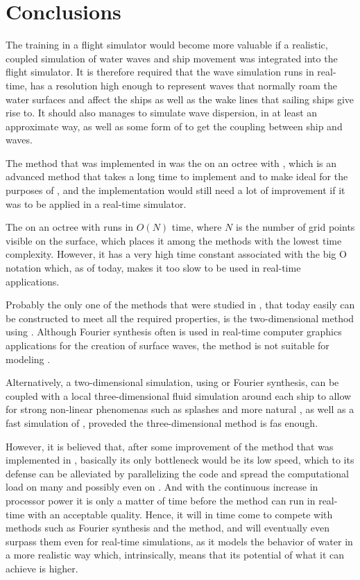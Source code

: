 \chapter{Conclusions}
\label{chap:conclusions}

The training in a flight simulator would become more valuable if a realistic, coupled simulation of water waves and ship movement was integrated into the flight simulator. It is therefore required that the wave simulation runs in real-time, has a resolution high enough to represent waves that normally roam the water surfaces and affect the ships as well as the wake lines that sailing ships give rise to. It should also manages to simulate wave dispersion, in at least an approximate way, as well as some form of \FSI to get the coupling between ship and waves.

The method that was implemented in \thisprojectwork was the \FVM on an octree with \FSM, which is an advanced method that takes a long time to implement and to make ideal for the purposes of \thismasterthesiswork {}\nspace, and the implementation would still need a lot of improvement if it was to be applied in a real-time simulator.

The \FVM on an octree with \FSM runs in $O(N)$ time, where $N$ is the number of grid points visible on the surface, which places it among the methods with the lowest time complexity. However, it has a very high time constant associated with the big O notation which, as of today, makes it too slow to be used in real-time applications.

Probably the only one of the methods that were studied in \thismasterthesiswork, that today easily can be constructed to meet all the required properties, is the two-dimensional method using \LPD. Although Fourier synthesis often is used in real-time computer graphics applications for the creation of surface waves, the method is not suitable for modeling \FSI.

Alternatively, a two-dimensional simulation, using \LPD or Fourier synthesis, can be coupled with a local three-dimensional fluid simulation around each ship to allow for strong non-linear phenomenas such as splashes and more natural \FSI, as well as a fast simulation of , proveded the three-dimensional method is fas enough.

However, it is believed that, after some improvement of the method that was implemented in \thisprojectwork, basically its only bottleneck would be its low speed, which to its defense can be alleviated by parallelizing the code and spread the computational load on many \CPUs and possibly even on \GPUs. And with the continuous increase in processor power it is only a matter of time before the method can run in real-time with an acceptable quality. Hence, it will in time come to compete with methods such as Fourier synthesis and the \LPD method, and will eventually even surpass them even for real-time simulations, as it models the behavior of water in a more realistic way which, intrinsically,  means that its potential of what it can achieve is higher.